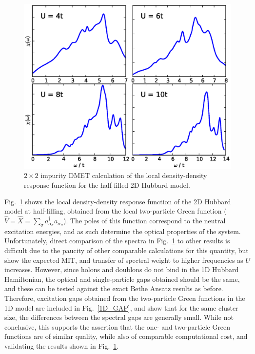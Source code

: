 \documentclass[aps,twocolumn,nobibnotes]{revtex4}
\begin{document}
\begin{figure}
\begin{center}
    \vspace{-2mm}
\includegraphics[scale=0.425]{Plots/2D_DD/2D_DD_Spectra.eps}
\end{center}
    \vspace{-8mm}
\caption{$2 \times 2$ impurity DMET calculation of the local density-density response function for the half-filled 2D Hubbard model.}
\label{2D_DD}
\end{figure}


Fig.~\ref{2D_DD} shows the local density-density response function of the 2D Hubbard model at half-filling, obtained from the local two-particle Green 
function (${\hat V}={\hat X}=\sum_{\sigma} a_{\alpha_{\sigma}}^{\dagger}a_{\alpha_{\sigma}}$). The poles of this 
function correspond to the neutral excitation energies, and as such determine 
the optical properties of the system\cite{Millis2012,Essler91}.
Unfortunately, direct comparison of the spectra in Fig.~\ref{2D_DD} to other results is difficult due to the paucity of other comparable 
calculations for this quantity, but show the expected MIT, and transfer of spectral weight to higher frequencies as $U$ increases.
However, since holons and doublons do not bind in the 1D Hubbard Hamiltonian, 
the optical and single-particle gaps obtained should be the same, and these can be tested against the exact Bethe Ansatz results as before\cite{Essler91}. Therefore, excitation gaps
obtained from the two-particle Green functions in the 1D model are included in Fig.~\ref{1D_GAP}, and show that for the same cluster size, the differences between the spectral gaps are generally small.
While not conclusive, this supports the assertion that the one- and two-particle Green functions are of similar quality, while also of comparable computational cost, and validating the results shown in Fig.~\ref{2D_DD}.
\end{document}
